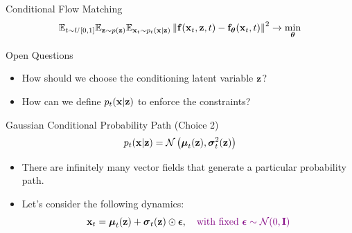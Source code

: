 \documentclass{beamer}
\begin{document}
\begin{frame}{Conditional Flow Matching}
	\vspace{-0.3cm}
	\[
		\mathbb{E}_{t \sim U[0, 1]} \mathbb{E}_{\mathbf{z} \sim p(\mathbf{z})} \mathbb{E}_{\mathbf{x}_t \sim p_t(\mathbf{x} | \mathbf{z})}\left\| \mathbf{f}(\mathbf{x}_t, \mathbf{z}, t) - \mathbf{f}_{\boldsymbol{\theta}}(\mathbf{x}_t, t) \right\|^2 \rightarrow \min_{\boldsymbol{\theta}}
	\]
	\vspace{-0.4cm}
	\begin{block}{Open Questions}
		\begin{itemize}
			\item How should we choose the conditioning latent variable $\mathbf{z}$?
			\item How can we define $p_t(\mathbf{x} | \mathbf{z})$ to enforce the constraints?
		\end{itemize}
	\end{block}
	\vspace{-0.3cm}
	\begin{block}{Gaussian Conditional Probability Path (Choice 2)}
		\vspace{-0.3cm}
		\[
			p_t(\mathbf{x} | \mathbf{z}) = \mathcal{N}\left(\boldsymbol{\mu}_t(\mathbf{z}), \boldsymbol{\sigma}_t^2(\mathbf{z})\right)
		\]
		\vspace{-0.5cm}
	\end{block}
	\begin{itemize}
		\item There are infinitely many vector fields that generate a particular probability path.
		\item Let's consider the following dynamics:
		\[
			\mathbf{x}_t = \boldsymbol{\mu}_t(\mathbf{z}) + \boldsymbol{\sigma}_t(\mathbf{z}) \odot \boldsymbol{\epsilon}, \quad {\color{violet} \text{with fixed } \boldsymbol{\epsilon}\sim \mathcal{N}(0, \mathbf{I})}
		\]
	\end{itemize}
\end{frame}
\end{document}

